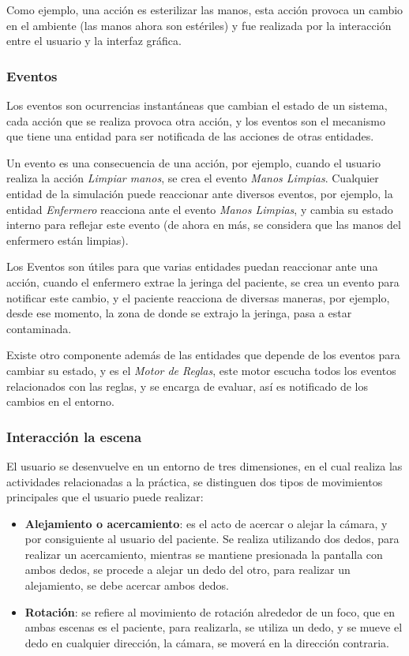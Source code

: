 Como ejemplo, una acción es esterilizar las manos, esta acción provoca un
cambio en el ambiente (las manos ahora son estériles) y fue realizada por la
interacción entre el usuario y la interfaz gráfica.

\subsubsection{Eventos}

Los eventos son ocurrencias instantáneas que cambian el estado de un
sistema\cite{banks2000dm}, cada acción que se realiza provoca otra acción, y los
eventos son el mecanismo que tiene una entidad para ser notificada de las
acciones de otras entidades.

Un evento es una consecuencia de una acción, por ejemplo, cuando el usuario 
realiza la acción \emph{Limpiar manos}, se crea el evento \emph{Manos Limpias}. 
Cualquier entidad de la simulación puede reaccionar ante diversos eventos, 
por ejemplo, la entidad \emph{Enfermero} reacciona ante el evento \emph{Manos
Limpias}, y cambia su estado interno para reflejar este evento (de ahora en 
más, se considera que las manos del enfermero están limpias).

Los Eventos son útiles para que varias entidades puedan reaccionar ante
una acción, cuando el enfermero extrae la jeringa del paciente, se crea un
evento para notificar este cambio, y el paciente reacciona de diversas maneras,
por ejemplo, desde ese momento, la zona de donde se extrajo la jeringa, pasa a 
estar contaminada. 

Existe otro componente además de las entidades que depende de los eventos 
para cambiar su estado, y es el \emph{Motor de Reglas}, este motor escucha
todos los eventos relacionados con las reglas, y se encarga de evaluar, así
es notificado de los cambios en el entorno.

\subsubsection{Interacción la escena}

El usuario se desenvuelve en un entorno de tres dimensiones, en el cual realiza las
actividades relacionadas a la práctica, se distinguen dos tipos de movimientos
principales que el usuario puede realizar:

\begin{itemize}
    \item \textbf{Alejamiento o acercamiento}: es el acto de acercar o alejar la
        cámara, y por consiguiente al usuario del paciente. Se realiza
        utilizando dos dedos, para realizar un acercamiento, mientras se
        mantiene presionada la pantalla con ambos dedos, se procede a alejar un
        dedo del otro, para realizar un alejamiento, se debe acercar ambos
        dedos.
    \item \textbf{Rotación}: se refiere al movimiento de rotación alrededor de
        un foco, que en ambas escenas es el paciente, para realizarla, se utiliza
        un dedo, y se mueve el dedo en cualquier dirección, la cámara, se moverá
        en la dirección contraria.
\end{itemize}


